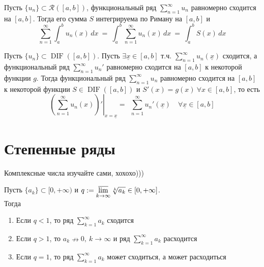 \documentclass[11pt]{article}
\DeclareMathOperator{\DIF}{DIF}
\begin{document}
\begin{theorem}
    Пусть $\{u_n\} \subset \mathcal{R}([a, b])$, функциональный ряд 
    $\displaystyle \sum_{n = 1}^{\infty} u_n$ равномерно сходится на 
    $[a, b]$. Тогда его сумма $S$ интегрируема по Риману на $[a, b]$ и 
    \[\sum_{n = 1}^{\infty} \int_{a}^{b} u_n(x) \,dx \ = \ \int_{a}^{b} 
    \sum_{n = 1}^{\infty} u_n(x) \,dx \ = \ \int_{a}^{b} S(x) \,dx\]
\end{theorem}

\begin{theorem}
    Пусть $\{u_n\} \subset \DIF([a, b])$. Пусть $\exists \underline{x} \in 
    [a, b]$ т.ч. $\displaystyle \sum_{n = 1}^{\infty} u_n(\underline{x})$ 
    сходится, а функциональный ряд $\displaystyle \sum_{n = 1}^{\infty} 
    u_n'$ равномерно сходится на $[a, b]$ к некоторой функции $g$. Тогда 
    функциональный ряд $\displaystyle \sum_{n = 1}^{\infty} u_n$ равномерно 
    сходится на $[a, b]$ к некоторой функции $S \in \DIF([a, b])$ и $S'(x) 
    = g(x) \ \forall x \in [a, b]$, то есть 
    \[\left.\left( \sum_{n = 1}^{\infty} u_n(x) \right)'\right|_{x = 
    \underline{x}} = \ \ \sum_{n = 1}^{\infty} u_n'(\underline{x}) \quad 
    \forall \underline{x} \in [a, b]\]
\end{theorem}

\section{Степенные ряды}

\begin{remark}
    Комплексные числа изучайте сами, хохохо)))
\end{remark}

\begin{theorem}
    Пусть $\{a_k\} \subset [0, +\infty)$ и $q := \displaystyle 
    \varlimsup_{k \to \infty} \sqrt[k]{a_k} \in [0, +\infty]$. \\
    Тогда 
    \begin{enumerate}
        \item Если $q < 1$, то ряд $\displaystyle \sum_{k = 1}^{\infty} a_k$ 
        сходится
        \item Если $q > 1$, то $a_k \nrightarrow 0, \ k \to \infty$ и ряд 
        $\displaystyle \sum_{k = 1}^{\infty} a_k$ расходится
        \item Если $q = 1$, то ряд $\displaystyle \sum_{k = 1}^{\infty} a_k$ 
        может сходиться, а может расходиться
    \end{enumerate}
\end{theorem}
\end{document}
